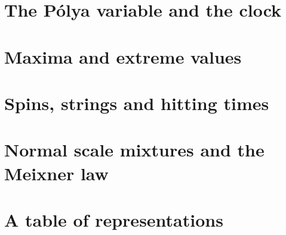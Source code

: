 \section{The P\'olya variable and the clock}

\section{Maxima and extreme values}

\section{Spins, strings and hitting times}

\section{Normal scale mixtures and the Meixner law}

\section{A table of representations}

